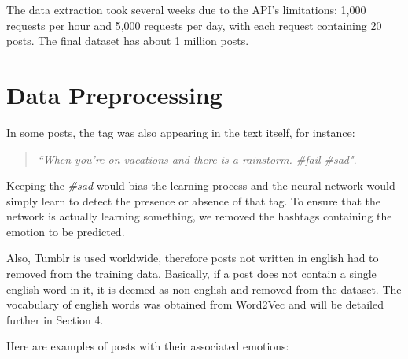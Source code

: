 The data extraction took several weeks due to the API's limitations: 1,000 requests per hour and 5,000 requests per day, with each request containing 20 posts. The final dataset has about 1 million posts.

\section{Data Preprocessing}
In some posts, the tag was also appearing in the text itself, for instance:
\begin{quote}
\textit{``When you're on vacations and there is a rainstorm. \#fail \#sad"}.
\end{quote}
Keeping the \textit{\#sad} would bias the learning process and the neural network would simply learn to detect the presence or absence of that tag. To ensure that the network is actually learning something, we removed the hashtags containing the emotion to be predicted.

Also, Tumblr is used worldwide, therefore posts not written in english had to removed from the training data. Basically, if a post does not contain a single english word in it, it is deemed as non-english and removed from the dataset. The vocabulary of english words was obtained from Word2Vec and will be detailed further in Section 4.

Here are examples of posts with their associated emotions:

